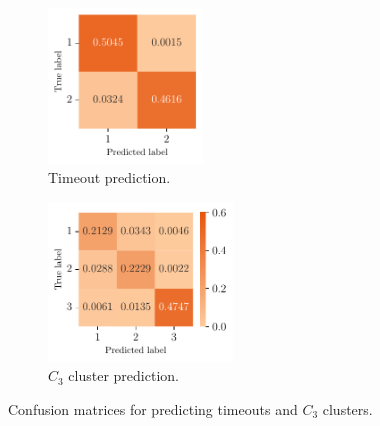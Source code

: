 \documentclass[sn-basic, Numbered]{sn-jnl} %
\begin{document}
\begin{figure}[tbp]
  \centering
  \begin{subfigure}{0.45\textwidth}
    \centering
    \includegraphics[height=4.123cm]{../plots/cm2labels.pdf}
    \caption{Timeout prediction.}
  \end{subfigure}
  \begin{subfigure}{0.45\textwidth}
    \centering
    \includegraphics[height=4.228cm]{../plots/cm3labels.pdf}
    \caption{$C_3$ cluster prediction.}
  \end{subfigure}
  \caption{Confusion matrices for predicting timeouts and $C_3$ clusters.}
\end{figure}
\end{document}
